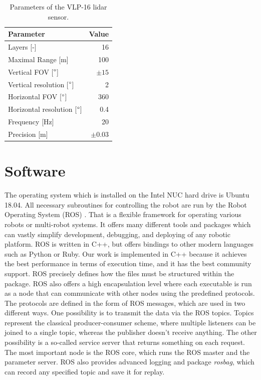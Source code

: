 \begin{table}[H]
\centering
\caption{Parameters of the VLP-16 lidar sensor.}
\begin{tabular}{lr}
\toprule
Parameter & Value \\
\midrule
Layers [-]                            & 16   \\ 
Maximal Range [m]                         & 100  \\
Vertical FOV [$\degree$]          & $\pm15$   \\ 
Vertical resolution [$\degree$]   & 2    \\ 
Horizontal FOV [$\degree$]        & 360  \\ 
Horizontal resolution [$\degree$] & 0.4  \\ 
Frequency [Hz]                    & 20    \\ 
Precision [m]                     & $\pm0.03$ \\ 
\bottomrule
\end{tabular}
\label{tab:lidar}
\end{table}

\section{Software}
The operating system which is installed on the Intel NUC hard drive is Ubuntu 18.04. All necessary subroutines for controlling the robot are run by the Robot Operating System (ROS) \cite{ros}. That is a flexible framework for operating various robots or multi-robot systems. It offers many different tools and packages which can vastly simplify development, debugging, and deploying of any robotic platform. ROS is written in C++, but offers bindings to other modern languages such as Python or Ruby. Our work is implemented in C++ because it achieves the best performance in terms of execution time, and it has the best community support. ROS precisely defines how the files must be structured within the package. ROS also offers a high encapsulation level where each executable is run as a node that can communicate with other nodes using the predefined protocols. The protocols are defined in the form of ROS messages, which are used in two different ways. One possibility is to transmit the data via the ROS topics. Topics represent the classical producer-consumer scheme, where multiple listeners can be joined to a single topic, whereas the publisher doesn't receive anything. The other possibility is a so-called service server that returns something on each request. The most important node is the ROS core, which runs the ROS master and the parameter server. ROS also provides advanced logging and package \textit{rosbag}, which can record any specified topic and save it for replay.

